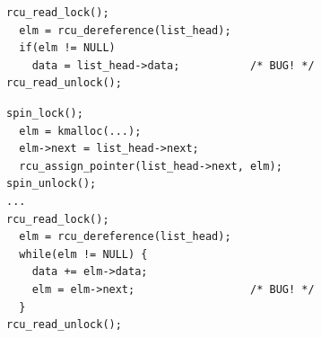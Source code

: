 \documentclass[preprint]{sigplanconf}
\begin{document}
\newsavebox\rcuderefbug
\begin{lrbox}{\rcuderefbug}
\begin{lstlisting}[basicstyle=\scriptsize\ttfamily]
rcu_read_lock();
  elm = rcu_dereference(list_head);
  if(elm != NULL)
    data = list_head->data;           /* BUG! */
rcu_read_unlock();
\end{lstlisting}
\end{lrbox}

\newsavebox\rcuassignderefbug
\begin{lrbox}{\rcuassignderefbug}
\begin{lstlisting}[basicstyle=\scriptsize\ttfamily]
spin_lock();
  elm = kmalloc(...);
  elm->next = list_head->next;
  rcu_assign_pointer(list_head->next, elm);
spin_unlock();
...
rcu_read_lock();
  elm = rcu_dereference(list_head);
  while(elm != NULL) {
    data += elm->data;
    elm = elm->next;                  /* BUG! */
  }
rcu_read_unlock();
\end{lstlisting}
\end{lrbox}
\end{document}
